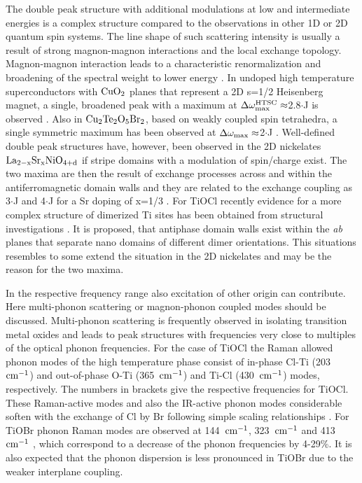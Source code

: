 \documentclass[prb,preprint,draft,amsmath,showpacs]{revtex4}
\begin{document}
The double peak structure with additional modulations at low and intermediate energies
is a complex structure compared to the observations in other 1D or 2D quantum spin
systems. The line shape of such scattering intensity is usually a result of strong
magnon-magnon interactions and the local exchange topology. Magnon-magnon interaction
leads to a characteristic renormalization and broadening of the spectral weight to lower
energy \cite{brenig01}. In undoped high temperature superconductors with $\rm CuO_2$
planes that represent a 2D s=1/2 Heisenberg magnet, a single, broadened peak with a
maximum at $\rm \Delta\omega_{max}^{HTSC}\approx$2.8$\cdot$J is observed
\cite{lyons88,sugai88,sugai99b}. Also in $\rm Cu_2Te_2O_5Br_2$, based on weakly coupled
spin tetrahedra, a single symmetric maximum has been observed at $\rm
\Delta\omega_{max}\approx$2$\cdot$J \cite{lemmens01,gros03,jensen03}. Well-defined
double peak structures have, however, been observed in the 2D nickelates $\rm
La_{2-x}Sr_{x}NiO_{4+d}$ if stripe domains with a modulation of spin/charge exist. The
two maxima are then the result of exchange processes across and within the
antiferromagnetic domain walls and they are related to the exchange coupling as
3$\cdot$J and 4$\cdot$J for a Sr doping of x=1/3 \cite{yamamoto98,blum98,gnezdilov02}.
For TiOCl recently evidence for a more complex structure of dimerized Ti sites has been
obtained from structural investigations \cite{lee03}. It is proposed, that antiphase
domain walls exist within the \emph{ab} planes that separate nano domains of different
dimer orientations. This situations resembles to some extend the situation in the 2D
nickelates and may be the reason for the two maxima.

In the respective frequency range also excitation of other origin can contribute. Here
multi-phonon scattering \cite{choi05b} or magnon-phonon coupled modes \cite{windt01}
should be discussed. Multi-phonon scattering is frequently observed in isolating
transition metal oxides and leads to peak structures with frequencies very close to
multiples of the optical phonon frequencies. For the case of TiOCl the Raman allowed
phonon modes of the high temperature phase consist of in-phase Cl-Ti (203~$\rm cm^{-1}$)
and out-of-phase O-Ti (365~$\rm cm^{-1}$) and Ti-Cl (430~$\rm cm^{-1}$) modes,
respectively. The numbers in brackets give the respective frequencies for TiOCl. These
Raman-active modes and also the IR-active phonon modes considerable soften with the
exchange of Cl by Br following simple scaling relationships \cite{caimi04b}. For TiOBr
phonon Raman modes are observed at 144~$\rm cm^{-1}$, 323~$\rm cm^{-1}$ and 413~$\rm
cm^{-1}$ \cite{choi05}, which correspond to a decrease of the phonon frequencies by
4-29\%. It is also expected that the phonon dispersion is less pronounced in TiOBr due
to the weaker interplane coupling.
\end{document}
